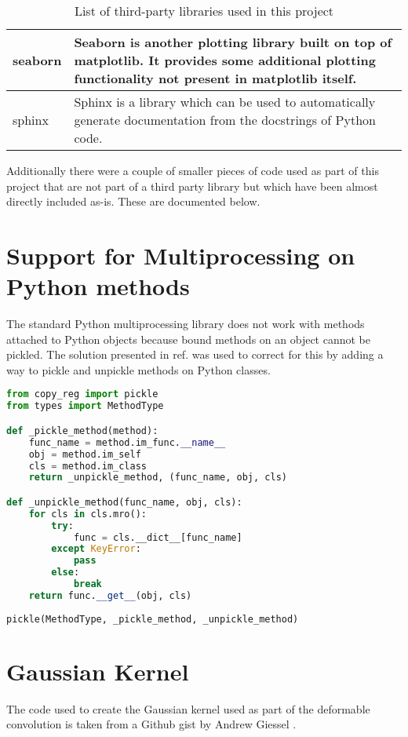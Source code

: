 \begin{table}[H]
\begin{tabular}{l p{14cm}}
      seaborn & Seaborn is another plotting library built on top of matplotlib. It provides some additional plotting functionality not present in matplotlib itself.\\ \hline
       sphinx & Sphinx is a library which can be used to automatically generate documentation from the docstrings of Python code.\\
\bottomrule
\end{tabular}	
\caption{List of third-party libraries used in this project}
\end{table}

Additionally there were a couple of smaller pieces of code used as part of this project that are not part of a third party library but which have been almost directly included as-is. These are documented below.

\section{Support for Multiprocessing on Python methods}
The standard Python multiprocessing library does not work with methods attached to Python objects because bound methods on an object cannot be pickled. The solution presented in ref. \cite{soMultiprocessing} was used to correct for this by adding a way to pickle and unpickle methods on Python classes.

\begin{lstlisting}[language=Python]
from copy_reg import pickle
from types import MethodType

def _pickle_method(method):
    func_name = method.im_func.__name__
    obj = method.im_self
    cls = method.im_class
    return _unpickle_method, (func_name, obj, cls)

def _unpickle_method(func_name, obj, cls):
    for cls in cls.mro():
        try:
            func = cls.__dict__[func_name]
        except KeyError:
            pass
        else:
            break
    return func.__get__(obj, cls)
    
pickle(MethodType, _pickle_method, _unpickle_method)	

\end{lstlisting}

\clearpage
\section{Gaussian Kernel}
The code used to create the Gaussian kernel used as part of the deformable convolution is taken from a Github gist by Andrew Giessel \cite{gistGaussianKernel}.

